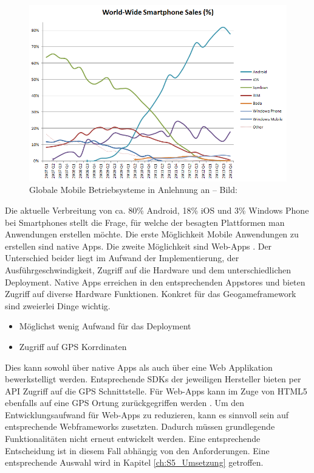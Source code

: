 \begin{figure}[H]
\begin{center}
\includegraphics[width=140mm]{images/ch4_img02_marketshare.png}
\caption{Globale Mobile Betriebsysteme in Anlehnung an \textcite{Gartner.2013} -- Bild: \cite{Wikipedia.2014}}
\label{img:ch4_img02_marketshare}
\end{center}
\end{figure}

Die aktuelle Verbreitung von ca. 80\% Android, 18\% iOS und 3\% Windows Phone bei Smartphones stellt die Frage, für welche der besagten Plattformen man Anwendungen erstellen möchte.
Die erste Möglichkeit Mobile Anwendungen zu erstellen sind native Apps. Die zweite Möglichkeit sind Web-Apps \cite{Charland.2011}.
Der Unterschied beider liegt im Aufwand der Implementierung, der Ausführgeschwindigkeit, Zugriff auf die Hardware und dem unterschiedlichen Deployment.
Native Apps erreichen in den entsprechenden Appstores und bieten Zugriff auf diverse Hardware Funktionen.
Konkret für das Geogameframework sind zweierlei Dinge wichtig.

\begin{itemize}
\item Möglichst wenig Aufwand für das Deployment
\item Zugriff auf GPS Korrdinaten
\end{itemize}

Dies kann sowohl über native  Apps als auch über eine Web Applikation bewerkstelligt werden. Entsprechende SDKs der jeweiligen Hersteller bieten per API Zugriff auf die GPS Schnittstelle. Für Web-Apps kann im Zuge von HTML5 ebenfalls auf eine GPS Ortung zurückgegriffen werden \cite{Holdener.2011}. Um den Entwicklungsaufwand für Web-Apps zu reduzieren, kann es sinnvoll sein auf entsprechende Webframeworks zusetzten. Dadurch müssen grundlegende Funktionalitäten nicht erneut entwickelt werden.
Eine entsprechende Entscheidung ist in diesem Fall abhängig von den Anforderungen. Eine entsprechende Auswahl wird in Kapitel \ref{ch:S5_Umsetzung} getroffen.

